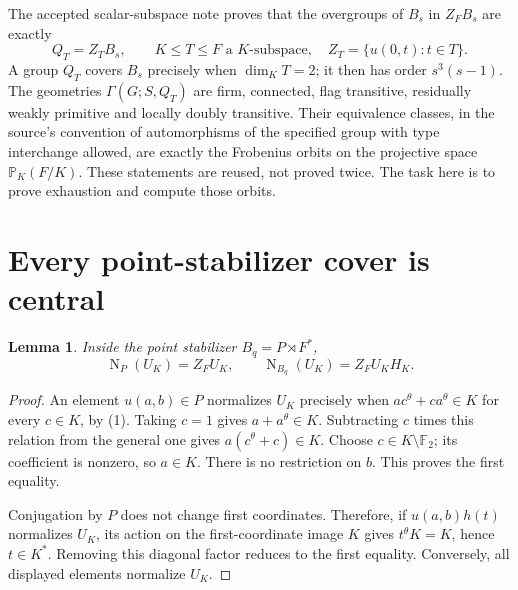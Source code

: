 \documentclass[11pt,a4paper]{article}
\newtheorem{lemma}[theorem]{Lemma}
\newcommand{\F}{\mathbb F}
\newcommand{\N}{\operatorname{N}}
\begin{document}
The accepted scalar-subspace note proves that the overgroups of
$B_s$ in $Z_FB_s$ are exactly
\[
 Q_T=Z_TB_s,\qquad K\le T\le F\text{ a }K\text{-subspace},
 \quad Z_T=\{u(0,t):t\in T\}.                            \tag{2}
\]
A group $Q_T$ covers $B_s$ precisely when $\dim_KT=2$; it then
has order $s^3(s-1)$. The geometries $\Gamma(G;S,Q_T)$ are firm,
connected, flag transitive, residually weakly primitive and locally
doubly transitive. Their equivalence classes, in the source's convention
of automorphisms of the specified group with type interchange allowed,
are exactly the Frobenius orbits on the projective space
$\mathbb P_K(F/K)$. These statements are reused, not proved twice.
The task here is to prove exhaustion and compute those orbits.

\section{Every point-stabilizer cover is central}
\begin{lemma}\label{normalizer}
Inside the point stabilizer $B_q=P\rtimes F^*$,
\[
 \N_P(U_K)=Z_FU_K,\qquad \N_{B_q}(U_K)=Z_FU_KH_K.
                                                        \tag{3}
\]
\end{lemma}
\begin{proof}
An element $u(a,b)\in P$ normalizes $U_K$ precisely when
$ac^\theta+ca^\theta\in K$ for every $c\in K$, by (1).
Taking $c=1$ gives $a+a^\theta\in K$. Subtracting $c$ times
this relation from the general one gives
$a(c^\theta+c)\in K$. Choose $c\in K\setminus\F_2$; its
coefficient is nonzero, so $a\in K$. There is no restriction
on $b$. This proves the first equality.

Conjugation by $P$ does not change first coordinates. Therefore,
if $u(a,b)h(t)$ normalizes $U_K$, its action on the first-coordinate
image $K$ gives $t^\theta K=K$, hence $t\in K^*$.
Removing this diagonal factor reduces to the first equality.
Conversely, all displayed elements normalize $U_K$.
\end{proof}
\end{document}

